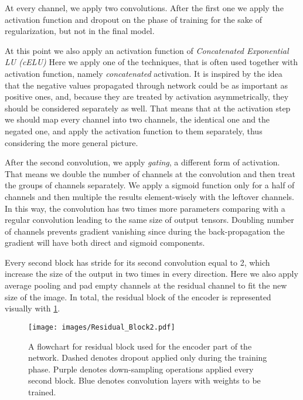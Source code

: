 At every channel, we apply two convolutions.
After the first one we apply the activation function and dropout on the phase of training for the sake of regularization, but not in the final model.
\medskip

At this point we also apply an activation function of \textit{Concatenated Exponential LU (cELU)}
Here we apply one of the techniques, that is often used together with activation function, namely \textit{concatenated} activation.
It is inspired by the idea that the negative values propagated through network could be as important as positive ones, and, because they are treated by activation asymmetrically, they should be considered separately as well\cite{bibl:concat_rectif}.
That means that at the activation step we should map every channel into two channels, the identical one and the negated one, and apply the activation function to them separately, thus considering the more general picture.
\medskip

After the second convolution, we apply \textit{gating}, a different form of activation.
That means we double the number of channels at the convolution and then treat the groups of channels separately.
We apply a sigmoid function only for a half of channels and then multiple the results element-wisely with the leftover channels.
In this way, the convolution has two times more parameters comparing with a regular convolution leading to the same size of output tensors.
Doubling number of channels prevents gradient vanishing since during the back-propagation the gradient will have both direct and sigmoid components\cite{bibl:conv_gating}.
\medskip

Every second block has stride for its second convolution equal to 2, which increase the size of the output in two times in every direction.
Here we also apply average pooling and pad empty channels at the residual channel to fit the new size of the image.
In total, the residual block of the encoder is represented visually with \ref{fig:res_block}.
\begin{figure}
	\centering
	\texttt{[image: images/Residual\_Block2.pdf]}
	\label{fig:res_block}
	\caption{A flowchart for residual block used for the encoder part of the network. Dashed denotes dropout applied only during the training phase. Purple denotes down-sampling operations applied every second block. Blue denotes convolution layers with weights to be trained.}
\end{figure}
\medskip

